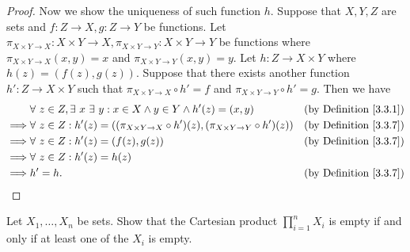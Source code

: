 \begin{proof}
    Now we show the uniqueness of such function \(h\).
    Suppose that \(X, Y, Z\) are sets and \(f : Z \to X, g : Z \to Y\) be functions.
    Let \(\pi_{X \times Y \to X} : X \times Y \to X, \pi_{X \times Y \to Y} : X \times Y \to Y\) be functions where \(\pi_{X \times Y \to X}(x, y) = x\) and \(\pi_{X \times Y \to Y}(x, y) = y\).
    Let \(h : Z \to X \times Y\) where \(h(z) = (f(z), g(z))\).
    Suppose that there exists another function \(h' : Z \to X \times Y\) such that \(\pi_{X \times Y \to X} \circ h' = f\) and \(\pi_{X \times Y \to Y} \circ h' = g\).
    Then we have
    \begin{align*}
                 & \forall\ z \in Z, \exists\ x \ \exists\ y : x \in X \land y \in Y \land h'(z) = (x, y)                  & \text{(by Definition \ref{3.3.1})} \\
        \implies & \forall\ z \in Z : h'(z) = ((\pi_{X \times Y \to X} \circ h')(z), (\pi_{X \times Y \to Y} \circ h')(z)) & \text{(by Definition \ref{3.3.7})} \\
        \implies & \forall\ z \in Z : h'(z) = (f(z), g(z))                                                                 & \text{(by Definition \ref{3.3.7})} \\
        \implies & \forall\ z \in Z : h'(z) = h(z)                                                                                                              \\
        \implies & h' = h.                                                                                                 & \text{(by Definition \ref{3.3.7})}
    \end{align*}
\end{proof}

\begin{exercise}\label{ex 3.5.8}
    Let \(X_1, \dots, X_n\) be sets.
    Show that the Cartesian product \(\prod_{i = 1}^n X_i\) is empty if and only if at least one of the \(X_i\) is empty.
\end{exercise}

